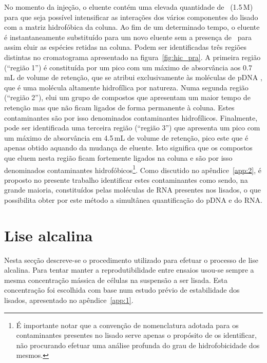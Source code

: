 No momento da injeção, o eluente contém uma elevada quantidade de \sulfatoamonio\ (1.5\,M) para que seja possível intensificar as interações dos vários componentes do lisado com a matriz hidrofóbica da coluna. Ao fim de um determinado tempo, o eluente é instantaneamente substituído para um novo eluente sem a presença de \sulfatoamonio\ para assim eluir as espécies retidas na coluna. Podem ser identificadas três regiões distintas no cromatograma apresentado na figura~\ref{fig:hic_pra}. A primeira região (``região 1'') é constituída por um pico com um máximo de absorvância aos 0.7\,mL de volume de retenção, que se atribui exclusivamente às moléculas de pDNA \cite{sousabab,diogo,gomesboro}, que é uma molécula altamente hidrofílica por natureza. Numa segunda região (``região 2''), elui um grupo de compostos que apresentam um maior tempo de retenção mas que não ficam ligados de forma permanente à coluna. Estes contaminantes são por isso denominados contaminantes hidrofílicos. Finalmente, pode ser identificada uma terceira região (``região 3'') que apresenta um pico com um máximo de absorvância em 4.5\,mL de volume de retenção, pico este que é apenas obtido aquando da mudança de eluente. Isto significa que os compostos que eluem nesta região ficam fortemente ligados na coluna e são por isso denominados contaminantes hidrofóbicos\footnote{É importante notar que a convenção de nomenclatura adotada para os contaminantes presentes no lisado serve apenas o propósito de os identificar, não procurando efetuar uma análise profunda do grau de hidrofobicidade dos mesmos.}. Como discutido no apêndice~\ref{app:2}, é proposto no presente trabalho identificar estes contaminantes como sendo, na grande maioria, constituídos pelas moléculas de RNA presentes nos lisados, o que possibilita obter por este método a simultânea quantificação do pDNA e do RNA.  

\section{Lise alcalina} %
\label{sec:lise_alcalina}
Nesta secção descreve-se o procedimento utilizado para efetuar o processo de lise alcalina. Para tentar manter a reprodutibilidade entre ensaios usou-se sempre a mesma concentração mássica de células na suspensão a ser lisada. Esta concentração foi escolhida com base num estudo prévio de estabilidade dos lisados, apresentado no apêndice~\ref{app:1}. 

